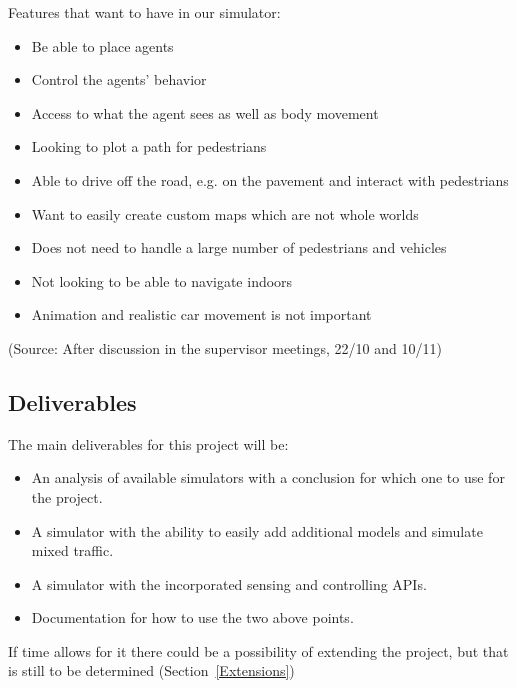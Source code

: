 
Features that want to have in our simulator: 
\begin{itemize}
\item Be able to place agents
\item Control the agents' behavior
\item Access to what the agent sees as well as body movement
\item Looking to plot a path for pedestrians
\item Able to drive off the road, e.g. on the pavement and interact with pedestrians
\item Want to easily create custom maps which are not whole worlds
\item Does not need to handle a large number of pedestrians and vehicles
\item Not looking to be able to navigate indoors
\item Animation and realistic car movement is not important
\end{itemize}
(Source: After discussion in the supervisor meetings, 22/10 and 10/11)
\subsection{Deliverables}
The main deliverables for this project will be:
\begin{itemize}
    \item An analysis of available simulators with a conclusion for which one to use for the project.
    \item A simulator with the ability to easily add additional models and simulate mixed traffic.
    \item A simulator with the incorporated sensing and controlling APIs.
    \item Documentation for how to use the two above points.
\end{itemize}
If time allows for it there could be a possibility of extending the project, but that is still to be determined (Section~\ref{Extensions}) 


